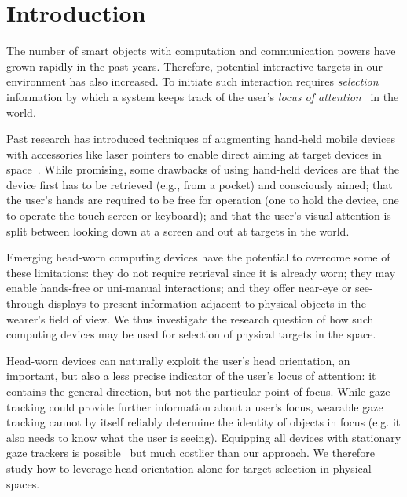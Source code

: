 \section{Introduction}

The number of smart objects with computation and communication powers have grown rapidly in the past years. Therefore, potential interactive targets in our environment has also increased.
To initiate such interaction requires {\em selection} information by which a system keeps track of the user's {\em locus of attention}~\cite{raskin} in the world. 

Past research has introduced techniques of augmenting hand-held mobile devices with accessories like laser pointers to enable direct aiming at target devices in space~\cite{beigl_point_1999,patel_2-way_2003}. While promising, some drawbacks of using hand-held devices are that the device first has to be retrieved (e.g., from a pocket) and consciously  aimed; that the user's hands are required to be free for operation (one to hold the device, one to operate the touch screen or keyboard); and that the user's visual attention is split between looking down at a screen and out at targets in the world. 

Emerging head-worn computing devices have the potential to overcome some of these limitations: they do not require retrieval since it is already worn; they may enable hands-free or uni-manual interactions; and they offer near-eye or see-through displays to present information adjacent to physical objects in the wearer's field of view. We thus investigate the research question of how such computing devices may be used for selection of physical targets in the space.

Head-worn devices can naturally exploit the user's head orientation, an important, but also a less precise indicator of the user's locus of attention: it contains the general direction, but not the particular point of focus. While gaze tracking could provide further information about a user's focus, wearable gaze tracking cannot by itself reliably determine the identity of objects in focus (e.g. it also needs to know what the user is seeing). Equipping all devices with stationary gaze trackers is possible~\cite{vertegaal2005media} but much costlier than our approach. We therefore study how to leverage head-orientation alone for target selection in physical spaces. 

